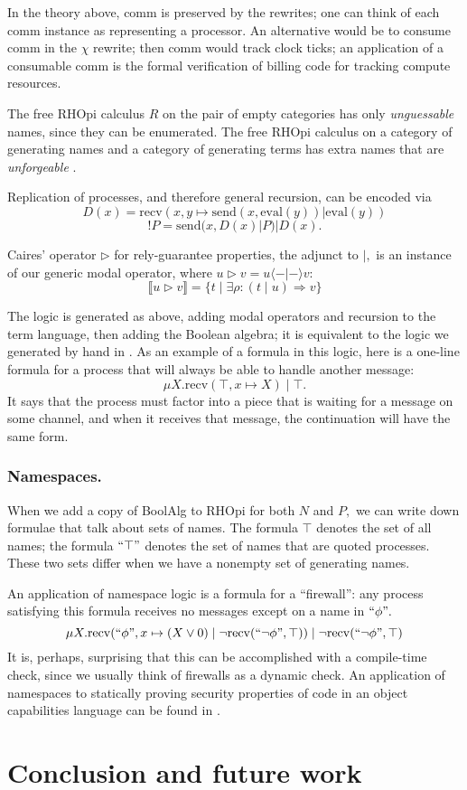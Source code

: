 \documentclass{llncs}
\newcommand{\interp}[1]{\llbracket #1 \rrbracket}
\newcommand{\maps}{\colon}
\newcommand{\send}{\mathrm{send}}
\newcommand{\recv}{\mathrm{recv}}
\renewcommand{\quote}[1]{``#1"}
\newcommand{\deref}[1]{\mathrm{eval}(#1)}
\begin{document}
In the theory above, comm is preserved by the rewrites; one can think of each comm instance as representing a processor.  An alternative would be to consume comm in the $\chi$ rewrite; then comm would track clock ticks; an application of a consumable comm is the formal verification of billing code for tracking compute resources.

The free RHOpi calculus $R$ on the pair of empty categories has only {\em unguessable} names, since they can be enumerated.  The free RHOpi calculus on a category of generating names and a category of generating terms has extra names that are {\em unforgeable} \cite{MillerYeeShapiro}.

Replication of processes, and therefore general recursion, can be encoded \cite{DBLP:journals/entcs/MeredithR05} via
\[D(x) = \recv(x, y\mapsto \send(x, \deref{y}) | \deref{y})\]
\[!P = \send(x, D(x) | P) | D(x).\]

Caires' \cite{Caires} operator $\triangleright$ for rely-guarantee properties, the adjunct to $|,$ is an instance of our generic modal operator, where $u \triangleright v = u \langle - | - \rangle v:$
\[ \interp{u \triangleright v} = \{ t \;|\; \exists \rho\maps (t\;|\;u) \Rightarrow v\} \]

The logic is generated as above, adding modal operators and recursion to the term language, then adding the Boolean algebra; it is equivalent to the logic we generated by hand in \cite{DBLP:conf/tgc/MeredithR05}.  As an example of a formula in this logic, here is a one-line formula for a process that will always be able to handle another message:
\[ \mu X. \recv(\top, x \mapsto X)\;|\;\top. \]
It says that the process must factor into a piece that is waiting for a message on some channel, and when it receives that message, the continuation will have the same form.

\subsubsection{Namespaces.}

When we add a copy of BoolAlg to RHOpi for both $N$ and $P,$ we can write down formulae that talk about sets of names.  The formula $\top$ denotes the set of all names; the formula $\quote{\top}$ denotes the set of names that are quoted processes.  These two sets differ when we have a nonempty set of generating names.

An application of namespace logic is a formula for a ``firewall'': any process satisfying this formula receives no messages except on a name in $\quote{\phi}.$
\[ \mu X. \recv(\quote{\phi}, x \mapsto (X \lor 0)\;|\;\neg\recv(\quote{\neg \phi}, \top))\;|\;\neg\recv(\quote{\neg \phi}, \top) \]
It is, perhaps, surprising that this can be accomplished with a compile-time check, since we usually think of firewalls as a dynamic check.  An application of namespaces to statically proving security properties of code in an object capabilities language can be found in \cite{DBLP:journals/corr/MeredithSD13}.

\section{Conclusion and future work}


\end{document}
